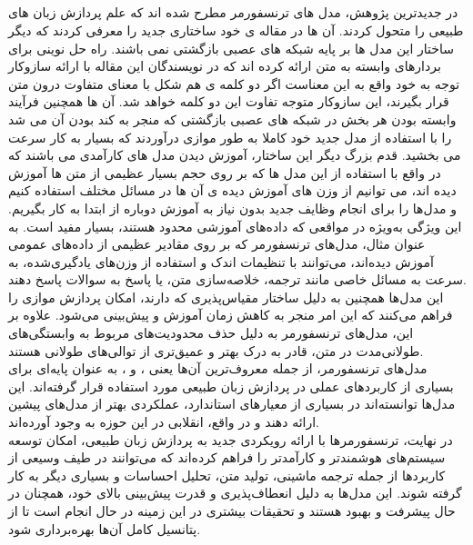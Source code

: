 \subsection{}
در جدیدترین پژوهش، مدل های ترنسفورمر مطرح شده اند که علم پردازش زبان های طبیعی را متحول کردند. آن ها در
مقاله ی خود ساختاری جدید را معرفی کردند که دیگر ساختار این مدل ها بر پایه شبکه های عصبی بازگشتی نمی باشند.
راه حل نوینی برای بردارهای وابسته به متن ارائه کرده اند که در
نویسندگان این مقاله با ارائه سازوکار توجه به خود
واقع به این معناست اگر دو کلمه ی هم شکل با معنای متفاوت درون متن قرار بگیرند، این سازوکار متوجه تفاوت این دو کلمه
خواهد شد. آن ها همچنین فرآیند وابسته بودن هر بخش در شبکه های عصبی بازگشتی که منجر به کند بودن آن می شد را
با استفاده از مدل جدید خود کاملا به طور موازی درآوردند که بسیار به کار سرعت می بخشید.
قدم بزرگ دیگر این ساختار، آموزش دیدن مدل های کارآمدی می باشند که در واقع با استفاده
از این مدل ها که بر روی حجم بسیار عظیمی از متن ها آموزش دیده اند، می توانیم از وزن های آموزش دیده ی آن ها در مسائل مختلف استفاده کنیم و مدل‌ها را برای انجام وظایف جدید بدون نیاز به آموزش دوباره از ابتدا به کار بگیریم. این ویژگی به‌ویژه در مواقعی که داده‌های آموزشی محدود هستند، بسیار مفید است. به عنوان مثال، مدل‌های ترنسفورمر که بر روی مقادیر عظیمی از داده‌های عمومی آموزش دیده‌اند، می‌توانند با تنظیمات اندک و استفاده از وزن‌های یادگیری‌شده، به سرعت به مسائل خاصی مانند ترجمه، خلاصه‌سازی متن، یا پاسخ به سوالات پاسخ دهند.
\\
این مدل‌ها همچنین به دلیل ساختار مقیاس‌پذیری که دارند، امکان پردازش موازی را فراهم می‌کنند که این امر منجر به کاهش زمان آموزش و پیش‌بینی می‌شود. علاوه بر این، مدل‌های ترنسفورمر به دلیل حذف محدودیت‌های مربوط به وابستگی‌های طولانی‌مدت در متن، قادر به درک بهتر و عمیق‌تری از توالی‌های طولانی هستند.
\\
مدل‌های ترنسفورمر، از جمله معروف‌ترین آن‌ها یعنی ،  و ، به عنوان پایه‌ای برای بسیاری از کاربردهای عملی در پردازش زبان طبیعی مورد استفاده قرار گرفته‌اند. این مدل‌ها توانسته‌اند در بسیاری از معیارهای استاندارد، عملکردی بهتر از مدل‌های پیشین ارائه دهند و در واقع، انقلابی در این حوزه به وجود آورده‌اند.
\\
در نهایت، ترنسفورمرها با ارائه رویکردی جدید به پردازش زبان طبیعی، امکان توسعه سیستم‌های هوشمندتر و کارآمدتر را فراهم کرده‌اند که می‌توانند در طیف وسیعی از کاربردها از جمله ترجمه ماشینی، تولید متن، تحلیل احساسات و بسیاری دیگر به کار گرفته شوند. این مدل‌ها به دلیل انعطاف‌پذیری و قدرت پیش‌بینی بالای خود، همچنان در حال پیشرفت و بهبود هستند و تحقیقات بیشتری در این زمینه در حال انجام است تا از پتانسیل کامل آن‌ها بهره‌برداری شود.

